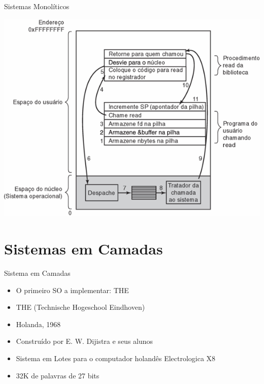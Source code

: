 \documentclass{beamer}
\begin{document}
\begin{frame}{Sistemas Monolíticos}

    \vspace{1cm}
    \begin{center}
        \includegraphics[width=0.5\linewidth]{assets/aula-tads-sope/SO-monolitico-3.png} %
    \end{center}
\end{frame}

\section{Sistemas em Camadas}
\begin{frame}{Sistema em Camadas}
    \begin{itemize}
        \item O primeiro SO a implementar: THE
        \item THE (Technische Hogeschool Eindhoven)
        \item Holanda, 1968
        \item Construído por E. W. Dijistra e seus alunos
        \item Sistema em Lotes para o computador holandês Electrologica X8
        \item 32K de palavras de 27 bits
    \end{itemize}
\end{frame}
\end{document}
